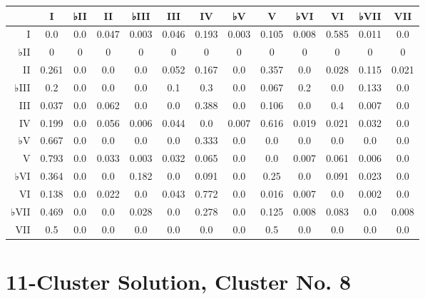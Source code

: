 \begin{table}[htbp]
\begin{minipage}{\linewidth}
\setlength{\tymax}{0.5\linewidth}
\centering
\small
\begin{tabulary}{\textwidth}{@{}RCCCCCCCCCCCC@{}} \toprule
&I&♭II&II&♭III&III&IV&♭V&V&♭VI&VI&♭VII&VII\\
\midrule
I&0.0&0.0&0.047&0.003&0.046&0.193&0.003&0.105&0.008&0.585&0.011&0.0\\
♭II&0&0&0&0&0&0&0&0&0&0&0&0\\
II&0.261&0.0&0.0&0.0&0.052&0.167&0.0&0.357&0.0&0.028&0.115&0.021\\
♭III&0.2&0.0&0.0&0.0&0.1&0.3&0.0&0.067&0.2&0.0&0.133&0.0\\
III&0.037&0.0&0.062&0.0&0.0&0.388&0.0&0.106&0.0&0.4&0.007&0.0\\
IV&0.199&0.0&0.056&0.006&0.044&0.0&0.007&0.616&0.019&0.021&0.032&0.0\\
♭V&0.667&0.0&0.0&0.0&0.0&0.333&0.0&0.0&0.0&0.0&0.0&0.0\\
V&0.793&0.0&0.033&0.003&0.032&0.065&0.0&0.0&0.007&0.061&0.006&0.0\\
♭VI&0.364&0.0&0.0&0.182&0.0&0.091&0.0&0.25&0.0&0.091&0.023&0.0\\
VI&0.138&0.0&0.022&0.0&0.043&0.772&0.0&0.016&0.007&0.0&0.002&0.0\\
♭VII&0.469&0.0&0.0&0.028&0.0&0.278&0.0&0.125&0.008&0.083&0.0&0.008\\
VII&0.5&0.0&0.0&0.0&0.0&0.0&0.0&0.5&0.0&0.0&0.0&0.0\\

\bottomrule

\end{tabulary}
\end{minipage}
\end{table}

\section{11-Cluster Solution, Cluster No. 8}
\label{11-clustersolutionclusterno.8}


